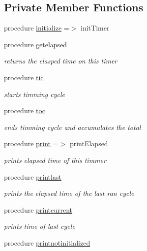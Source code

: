 \subsection*{Private Member Functions}
\begin{DoxyCompactItemize}
\item 
procedure \mbox{\hyperlink{structsimulationtimer__mod_1_1timer__class_a5ff00a291d05b6135e421e4b5718c810}{initialize}} =$>$ init\+Timer
\item 
procedure \mbox{\hyperlink{structsimulationtimer__mod_1_1timer__class_a8d93e7223e1bbd78bc38c72e88fd2e41}{getelapsed}}
\begin{DoxyCompactList}\small\item\em returns the elasped time on this timer \end{DoxyCompactList}\item 
procedure \mbox{\hyperlink{structsimulationtimer__mod_1_1timer__class_ab51b61f25cc929cb440d0b9ffd039b34}{tic}}
\begin{DoxyCompactList}\small\item\em starts timming cycle \end{DoxyCompactList}\item 
procedure \mbox{\hyperlink{structsimulationtimer__mod_1_1timer__class_aa86e28516c4a22dac2aba3ccbf027233}{toc}}
\begin{DoxyCompactList}\small\item\em ends timming cycle and accumulates the total \end{DoxyCompactList}\item 
procedure \mbox{\hyperlink{structsimulationtimer__mod_1_1timer__class_a34a700b5bb4f2a401a582caf995e4cae}{print}} =$>$ print\+Elapsed
\begin{DoxyCompactList}\small\item\em prints elapsed time of this timmer \end{DoxyCompactList}\item 
procedure \mbox{\hyperlink{structsimulationtimer__mod_1_1timer__class_a1ac8844fe0766c418d301064155d9cc9}{printlast}}
\begin{DoxyCompactList}\small\item\em prints the elapsed time of the last ran cycle \end{DoxyCompactList}\item 
procedure \mbox{\hyperlink{structsimulationtimer__mod_1_1timer__class_ae7896d93f60b31af526f91adc324a641}{printcurrent}}
\begin{DoxyCompactList}\small\item\em prints time of last cycle \end{DoxyCompactList}\item 
procedure \mbox{\hyperlink{structsimulationtimer__mod_1_1timer__class_a559692fe52fabf6a4f5078b03ed08620}{printnotinitialized}}
\end{DoxyCompactItemize}
